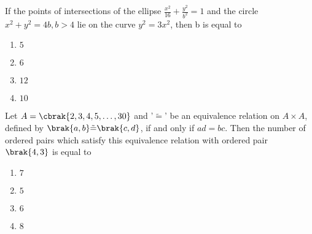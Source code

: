     \item If the points of intersections of the ellipse $\frac{x^2}{16} + \frac{y^2}{b^2} = 1$ and the circle $x^2 + y^2 = 4b, b > 4$ lie on the curve $y^2 = 3x^2$, then b is equal to
    \hfill{}

	\begin{enumerate}
		\item $5$ 
		\item $6$
		\item $12$
		\item $10$
	\end{enumerate}

    \item Let $A = \cbrak{2, 3, 4, 5, \dots, 30}$ and '$\tilde{=}$' be an equivalence relation on $A \times A$, defined by $\brak{a, b} \tilde{=} \brak{c, d}$, if and only if $ad = bc$. Then the number of ordered pairs which satisfy this equivalence relation with ordered pair $\brak{4, 3}$ is equal to
    \hfill{}

	\begin{enumerate}
		\item $7$ 
		\item $5$
		\item $6$
		\item $8$
	\end{enumerate}